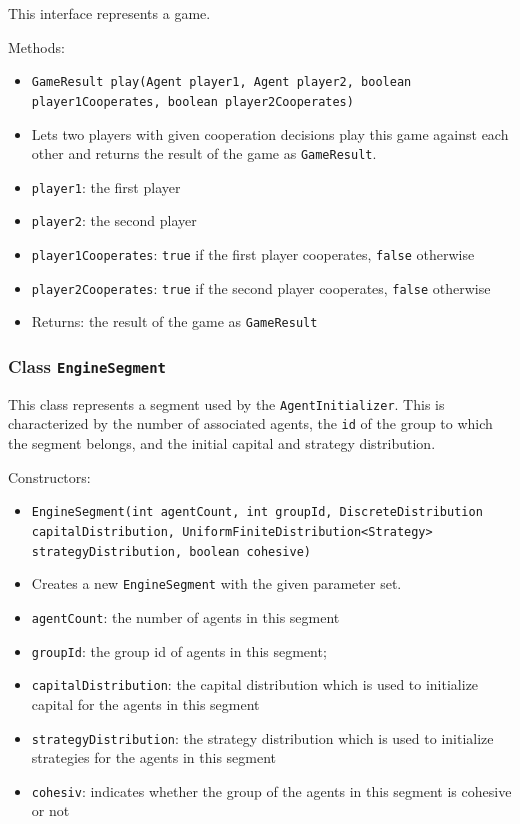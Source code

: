 \documentclass[parskip=full,11pt]{scrartcl}
\begin{document}
This interface represents a game.

Methods:
\begin{itemize}\itemsep -10pt
\item[] \texttt{GameResult play(Agent player1, Agent player2, boolean player1Cooperates, boolean player2Cooperates)}
\item[] Lets two players with given cooperation decisions play this game against each other and returns the result of the game as \texttt{GameResult}.
\item[] \texttt{player1}: the first player
\item[] \texttt{player2}: the second player
\item[] \texttt{player1Cooperates}: \texttt{true} if the first player cooperates, \texttt{false} otherwise
\item[] \texttt{player2Cooperates}: \texttt{true} if the second player cooperates, \texttt{false} otherwise
\item[] Returns: the result of the game as \texttt{GameResult}
\end{itemize}

\subsubsection{Class \texttt{EngineSegment}}

This class represents a segment used by the \texttt{AgentInitializer}. This is characterized by the number of associated agents, the \texttt{id} of the group to which the segment belongs, and the initial capital and strategy distribution.

Constructors:
\begin{itemize} \itemsep -10pt
	\item \texttt{EngineSegment(int agentCount, int groupId, DiscreteDistribution capitalDistribution, UniformFiniteDistribution<Strategy> strategyDistribution, boolean cohesive)}
	\item[] Creates a new \texttt{EngineSegment} with the given parameter set.
	\item[] \texttt{agentCount}: the number of agents in this segment
	\item[] \texttt{groupId}: the group id of agents in this segment;
	\item[] \texttt{capitalDistribution}: the capital distribution which is used to initialize capital for the agents in this segment
	\item[] \texttt{strategyDistribution}: the strategy distribution which is used to initialize strategies for the agents in this segment
	\item[] \texttt{cohesiv}: indicates whether the group of the agents in this segment is cohesive or not
\end{itemize}
\end{document}
